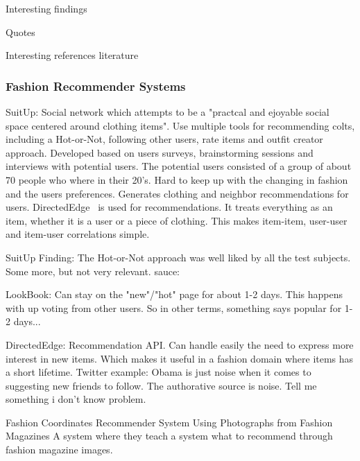 Interesting findings

Quotes

Interesting references literature




\subsubsection{Fashion Recommender Systems}

SuitUp:
Social network which attempts to be a "practcal and ejoyable social space centered around clothing items".
Use multiple tools for recommending colts, including a Hot-or-Not, following other users, rate items and outfit creator approach.
Developed based on users surveys, brainstorming sessions and interviews with potential users.
The potential users consisted of a group of about 70 people who where in their 20's.
Hard to keep up with the changing in fashion and the users preferences.
Generates clothing and neighbor recommendations for users.
DirectedEdge~\cite{direcetedEdge} is used for recommendations.
It treats everything as an item, whether it is a user or a piece of clothing.
This makes item-item, user-user and item-user correlations simple.

SuitUp Finding:
The Hot-or-Not approach was well liked by all the test subjects.
Some more, but not very relevant.
sauce:\cite{SuitUp}

LookBook:
Can stay on the "new"/"hot" page for about 1-2 days.
This happens with up voting from other users.
So in other terms, something says popular for 1-2 days...

DirectedEdge:
Recommendation API.
Can handle easily the need to express more interest in new items.
Which makes it useful in a fashion domain where items has a short lifetime.
Twitter example:
Obama is just noise when it comes to suggesting new friends to follow.
The authorative source is noise.
Tell me something i don't know problem.

Fashion Coordinates Recommender System Using Photographs from Fashion Magazines \cite{Iwata:2011}
A system where they teach a system what to recommend through fashion magazine images.



